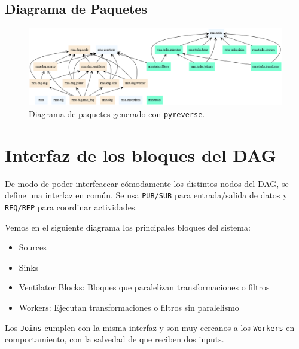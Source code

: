 \documentclass[titlepage,a4paper,oneside]{article}
\begin{document}
\subsection{Diagrama de Paquetes}
\begin{figure}[H]
\centering
\includegraphics[width=\textwidth]{images/packages.png}
\caption{Diagrama de paquetes generado con \texttt{pyreverse}.}
\end{figure}

\section{Interfaz de los bloques del DAG}
De modo de poder interfeacear cómodamente los distintos nodos del DAG, se define una interfaz en común. Se usa \texttt{PUB/SUB} para entrada/salida de datos y \texttt{REQ/REP} para coordinar actividades.

Vemos en el siguiente diagrama los principales bloques del sistema:
\begin{itemize}
	\item Sources
	\item Sinks
	\item Ventilator Blocks: Bloques que paralelizan transformaciones o filtros
	\item Workers: Ejecutan transformaciones o filtros sin paralelismo
\end{itemize}

Los \texttt{Joins} cumplen con la misma interfaz y son muy cercanos a los \texttt{Workers} en comportamiento, con la salvedad de que reciben dos inputs.
\end{document}
